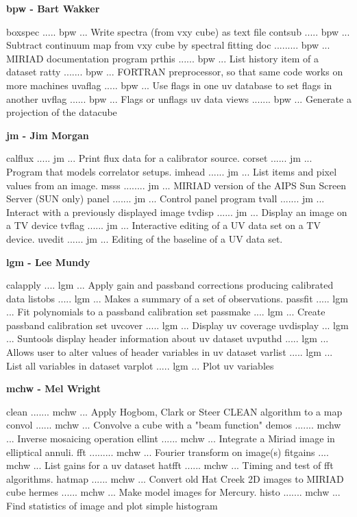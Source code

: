 \par\centerline {\bf bpw - Bart Wakker}
{\eightpoint\begintt
boxspec ..... bpw  ... Write spectra (from vxy cube) as text file 
contsub ..... bpw  ... Subtract continuum map from vxy cube by spectral fitting 
doc ......... bpw  ... MIRIAD documentation program 
prthis ...... bpw  ... List history item of a dataset 
ratty ....... bpw  ... FORTRAN preprocessor, so that same code works on more machines 
\endtt}
{\eightpoint\begintt
uvaflag ..... bpw  ... Use flags in one uv database to set flags in another 
uvflag ...... bpw  ... Flags or unflags uv data 
views ....... bpw  ... Generate a projection of the datacube 
\endtt}
\par\centerline {\bf jm - Jim Morgan}
{\eightpoint\begintt
calflux ..... jm   ... Print flux data for a calibrator source. 
corset ...... jm   ... Program that models correlator setups. 
imhead ...... jm   ... List items and pixel values from an image. 
msss ........ jm   ... MIRIAD version of the AIPS Sun Screen Server (SUN only) 
panel ....... jm   ... Control panel program 
\endtt}
{\eightpoint\begintt
tvall ....... jm   ... Interact with a previously displayed image 
tvdisp ...... jm   ... Display an image on a TV device 
tvflag ...... jm   ... Interactive editing of a UV data set on a TV device. 
uvedit ...... jm   ... Editing of the baseline of a UV data set. 
\endtt}
\par\centerline {\bf lgm - Lee Mundy}
{\eightpoint\begintt
calapply .... lgm  ... Apply gain and passband corrections producing calibrated data
listobs ..... lgm  ... Makes a summary of a set of observations. 
passfit ..... lgm  ... Fit polynomials to a passband calibration set 
passmake .... lgm  ... Create passband calibration set 
uvcover ..... lgm  ... Display uv coverage 
\endtt}
{\eightpoint\begintt
uvdisplay ... lgm  ... Suntools display header information about uv dataset 
uvputhd ..... lgm  ... Allows user to alter values of header variables in uv dataset
varlist ..... lgm  ... List all variables in dataset 
varplot ..... lgm  ... Plot uv variables 
\endtt}
\par\centerline {\bf mchw - Mel Wright}
{\eightpoint\begintt
clean ....... mchw ... Apply Hogbom, Clark or Steer CLEAN algorithm to a map 
convol ...... mchw ... Convolve a cube with a "beam function" 
demos ....... mchw ... Inverse mosaicing operation 
ellint ...... mchw ... Integrate a Miriad image in elliptical annuli. 
fft ......... mchw ... Fourier transform on image(s) 
\endtt}
{\eightpoint\begintt
fitgains .... mchw ... List gains for a uv dataset 
hatfft ...... mchw ... Timing and test of fft algorithms. 
hatmap ...... mchw ... Convert old Hat Creek 2D images to MIRIAD cube 
hermes ...... mchw ... Make model images for Mercury. 
histo ....... mchw ... Find statistics of image and plot simple histogram 
\endtt}
